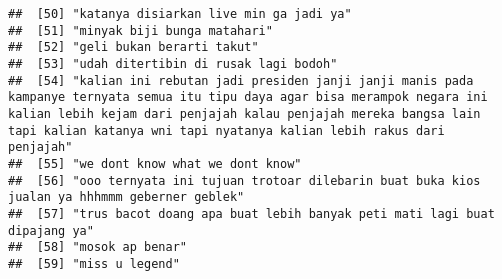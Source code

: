 \documentclass[
]{article}
\begin{document}
\begin{verbatim}
##  [50] "katanya disiarkan live min ga jadi ya"                                                                                                                                                                                                                                             
##  [51] "minyak biji bunga matahari"                                                                                                                                                                                                                                                        
##  [52] "geli bukan berarti takut"                                                                                                                                                                                                                                                          
##  [53] "udah ditertibin di rusak lagi bodoh"                                                                                                                                                                                                                                               
##  [54] "kalian ini rebutan jadi presiden janji janji manis pada kampanye ternyata semua itu tipu daya agar bisa merampok negara ini kalian lebih kejam dari penjajah kalau penjajah mereka bangsa lain tapi kalian katanya wni tapi nyatanya kalian lebih rakus dari penjajah"             
##  [55] "we dont know what we dont know"                                                                                                                                                                                                                                                    
##  [56] "ooo ternyata ini tujuan trotoar dilebarin buat buka kios jualan ya hhhmmm geberner geblek"                                                                                                                                                                                         
##  [57] "trus bacot doang apa buat lebih banyak peti mati lagi buat dipajang ya"                                                                                                                                                                                                            
##  [58] "mosok ap benar"                                                                                                                                                                                                                                                                    
##  [59] "miss u legend"                                                                                                                                                                                                                                                                     

\end{verbatim}
\end{document}
